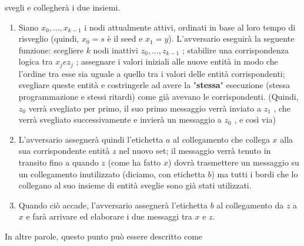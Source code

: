 \begin{enumerate}
\begin{enumerate}
                    svegli e collegherà i due insiemi.
                    \begin{enumerate}
                        \item Siano $x_0 , . . . , x_{k-1}$ i nodi attualmente
                              attivi, ordinati in base al loro tempo di
                              risveglio (quindi, $x_0 = s$ è il seed e $x_1 =
                                  y$). L'avversario eseguirà la seguente funzione:
                              scegliere $k$ nodi inattivi $z_0 , . . . ,
                                  z_{k-1}$ ; stabilire una corrispondenza logica tra
                              $x_j e z_j$ ; assegnare i valori iniziali alle
                              nuove entità in modo che l'ordine tra esse sia
                              uguale a quello tra i valori delle entità
                              corrispondenti; svegliare queste entità e
                              costringerle ad avere la "\textbf{stessa}"
                              esecuzione (stessa programmazione e stessi
                              ritardi) come già avevano le corrispondenti.
                              (Quindi, $z_0$ verrà svegliato per primo, il suo
                              primo messaggio verrà inviato a $z_1$ , che verrà
                              svegliato successivamente e invierà un messaggio a
                              $z_0$ , e così via)
                        \item L'avversario assegnerà quindi l'etichetta $a$ al
                              collegamento che collega $x$ alla sua
                              corrispondente entità $z$ nel nuovo set; il
                              messaggio verrà tenuto in transito fino a quando
                              $z$ (come ha fatto $x$) dovrà trasmettere un
                              messaggio su un collegamento inutilizzato
                              (diciamo, con etichetta $b$) ma tutti i bordi che
                              lo collegano al suo insieme di entità sveglie sono
                              già stati utilizzati.
                        \item Quando ciò accade, l'avversario assegnerà
                              l'etichetta $b$ al collegamento da $z$ a $x$ e
                              farà arrivare ed elaborare i due messaggi tra $x$
                              e $z$.
                    \end{enumerate}
                    In altre parole, questo punto può essere descritto come

\end{enumerate}
\end{enumerate}
